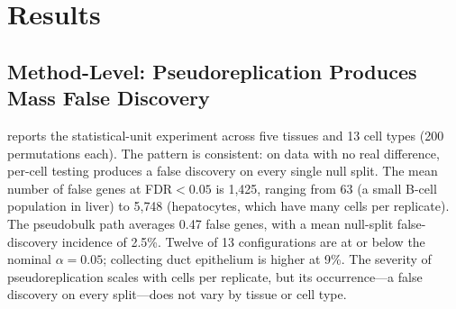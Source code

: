 \documentclass[pmlr,twocolumn,10pt]{jmlr}
\begin{document}
\section{Results}

\subsection{Method-Level: Pseudoreplication Produces Mass False Discovery}

 reports the statistical-unit experiment across five tissues
and 13 cell types (200 permutations each). The pattern is consistent: on data
with no real difference, per-cell testing produces a false discovery on every
single null split. The mean number of false genes at FDR${<}0.05$ is 1{,}425,
ranging from 63 (a small B-cell population in liver) to 5{,}748 (hepatocytes,
which have many cells per replicate). The pseudobulk path averages 0.47
false genes, with a mean null-split false-discovery incidence of 2.5\%. Twelve
of 13 configurations are at or below the nominal $\alpha{=}0.05$; collecting
duct epithelium is higher at 9\%. The severity of pseudoreplication scales
with cells per replicate, but its occurrence---a false discovery on every
split---does not vary by tissue or cell type.
\end{document}
